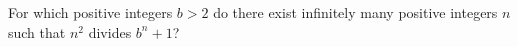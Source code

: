 For which positive integers $b>2$ do there exist infinitely many positive integers $n$ such that $n^2$ divides $b^n+1$?